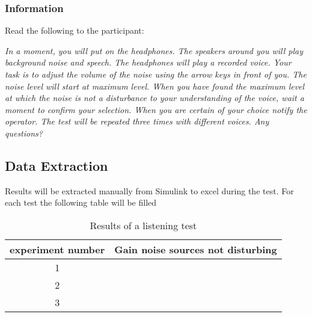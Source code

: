 \subsubsection{Information}\label{subsubsec:attenuationInformation}
Read the following to the participant:

\textit{In a moment, you will put on the headphones. The speakers around you will play background noise and speech. The headphones will play a recorded voice. Your task is to adjust the volume of the noise using the arrow keys in front of you. The noise level will start at maximum level. When you have found the maximum level at which the noise is not a disturbance to your understanding of the voice, wait a moment to confirm your selection. When you are certain of your choice notify the operator. The test will be repeated three times with different voices. Any questions?}


\subsection{Data Extraction}
Results will be extracted manually from Simulink to excel during the test.
For each test the following table will be filled \\
\begin{table}[h]
\centering
	\begin{tabular}{c  c } \toprule
		experiment number & Gain noise sources not disturbing  \\ \bottomrule
		1 &   \\
		2 &   \\
		3 &   \\ \bottomrule
	\end{tabular}
	\caption{Results of a listening test}
	\label{tab:ListeningRes}
\end{table}

